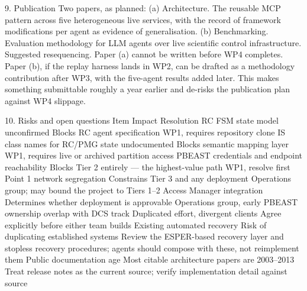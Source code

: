 9. Publication
Two papers, as planned:
(a) Architecture. The reusable MCP pattern across five heterogeneous live services, with the record of framework modifications per agent as evidence of generalisation.
(b) Benchmarking. Evaluation methodology for LLM agents over live scientific control infrastructure.
Suggested resequencing. Paper (a) cannot be written before WP4 completes. Paper (b), if the replay harness lands in WP2, can be drafted as a methodology contribution after WP3, with the five-agent results added later. This makes something submittable roughly a year earlier and de-risks the publication plan against WP4 slippage.

10. Risks and open questions
Item
Impact
Resolution
RC FSM state model unconfirmed
Blocks RC agent specification
WP1, requires repository clone
IS class names for RC/PMG state undocumented
Blocks semantic mapping layer
WP1, requires live or archived partition access
PBEAST credentials and endpoint reachability
Blocks Tier 2 entirely — the highest-value path
WP1, resolve first
Point 1 network segregation
Constrains Tier 3 and any deployment
Operations group; may bound the project to Tiers 1–2
Access Manager integration
Determines whether deployment is approvable
Operations group, early
PBEAST ownership overlap with DCS track
Duplicated effort, divergent clients
Agree explicitly before either team builds
Existing automated recovery
Risk of duplicating established systems
Review the ESPER-based recovery layer and stopless recovery procedures; agents should compose with these, not reimplement them
Public documentation age
Most citable architecture papers are 2003–2013
Treat release notes as the current source; verify implementation detail against source



